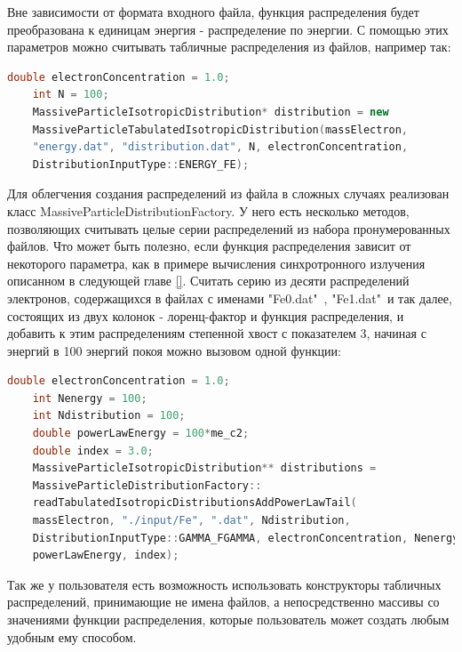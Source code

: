 Вне зависимости от формата входного файла, функция распределения будет преобразована к единицам энергия - распределение по энергии. С помощью этих параметров можно считывать табличные распределения из файлов, например так:

\begin{lstlisting}[language=c++]
	double electronConcentration = 1.0;
	int N = 100;
	MassiveParticleIsotropicDistribution* distribution = new
	MassiveParticleTabulatedIsotropicDistribution(massElectron,
	"energy.dat", "distribution.dat", N, electronConcentration,
	DistributionInputType::ENERGY_FE);
\end{lstlisting}

Для облегчения создания распределений из файла в сложных случаях реализован класс MassiveParticleDistributionFactory. У него есть несколько методов, позволяющих считывать целые серии распределений из набора пронумерованных файлов. Что может быть полезно, если функция распределения зависит от некоторого параметра, как в примере вычисления синхротронного излучения описанном в следующей главе \ref{}. Считать серию из десяти распределений электронов, содержащихся в файлах с именами  "Fe0.dat"\ , "Fe1.dat"\  и так далее, состоящих из двух колонок - лоренц-фактор и функция распределения, и добавить к этим распределениям степенной хвост с показателем 3, начиная с энергий в 100 энергий покоя можно вызовом одной функции: 

\begin{lstlisting}[language=c++]
	double electronConcentration = 1.0;
	int Nenergy = 100;
	int Ndistribution = 100;
	double powerLawEnergy = 100*me_c2;
	double index = 3.0;
	MassiveParticleIsotropicDistribution** distributions = 
	MassiveParticleDistributionFactory::
	readTabulatedIsotropicDistributionsAddPowerLawTail(
	massElectron, "./input/Fe", ".dat", Ndistribution, 
	DistributionInputType::GAMMA_FGAMMA, electronConcentration, Nenergy,
	powerLawEnergy, index);
\end{lstlisting}

Так же у пользователя есть возможность использовать конструкторы табличных распределений, принимающие не имена файлов, а непосредственно массивы со значениями функции распределения, которые пользователь может создать любым удобным ему способом.

